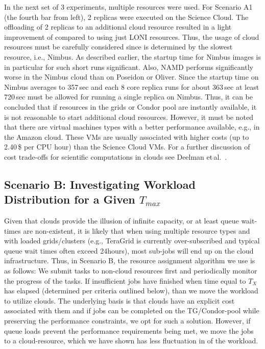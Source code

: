 \documentclass[3p,twocolumn]{elsarticle}
\begin{document}
In the next set of 3 experiments, multiple resources were used. For
Scenario A1 (the fourth bar from left), 2 replicas were executed on
the Science Cloud. The offloading of 2 replicas to an additional cloud
resource resulted in a light improvement of \tc compared to using
just LONI resources. Thus, the usage of cloud resources must be carefully
considered since \tc is determined by the slowest resource, i.e., Nimbus. As
described earlier, the startup time for Nimbus images is in particular
for such short runs significant. Also, NAMD performs significantly
worse in the Nimbus cloud than on Poseidon or Oliver. Since the
startup time on Nimbus averages to 357\,sec and each 8 core replica runs
for about 363\,sec at least 720\,sec must be allowed for running a single replica on
Nimbus. Thus, it can be concluded that if resources in the grids or
Condor pool are instantly available, it is not reasonable to start
additional cloud resources.  However, it must be noted that there are
virtual machines types with a better performance available, e.g., in
the Amazon cloud. These VMs are usually associated with higher costs
(up to 2.40\,\$ per CPU hour) than the Science Cloud VMs. For a
further discussion of cost trade-offs for scientific computations in
clouds see Deelman et\,al.~\cite{1413421}.


\subsection{Scenario B: Investigating Workload Distribution 
            for a Given $T_{max}$\\}

Given that clouds provide the illusion of infinite capacity, or at
least queue wait-times are non-existent, it is likely that when using
multiple resource types and with loaded grids/clusters (e.g., TeraGrid
is currently over-subscribed and typical queue wait times often exceed
24hours), most sub-jobs will end up on the cloud infrastructure.
Thus, in Scenario B, the resource assignment algorithm we use is as
follows: We submit tasks to non-cloud resources first and periodically
monitor the progress of the tasks. If insufficient jobs have finished
when time equal to $T_{X}$ has elapsed (determined per criteria
outlined below),
than we move the workload to utilize clouds.  The underlying basis is
that clouds have an explicit cost associated with them and if jobs can
be completed on the TG/Condor-pool while preserving the performance
constraints, we opt for such a solution. However, if queue loads
prevent the performance requirements being met, we move the jobs to a
cloud-resource, which we have shown has less fluctuation in \tc of the
workload.
\end{document}
